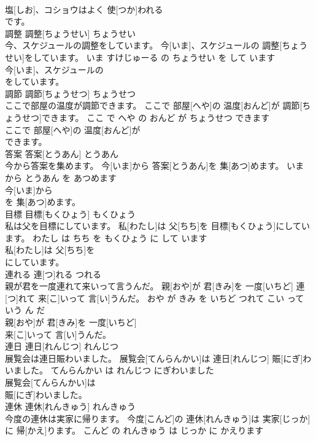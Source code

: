 \documentclass[8pt]{extreport}
\begin{document}
\begin{CJK}{UTF8}{min}
\\	塩[しお]、コショウはよく 使[つか]われる
\\	です。			
\\	調整	調整[ちょうせい]	ちょうせい	
\\	今、スケジュールの調整をしています。	今[いま]、スケジュールの 調整[ちょうせい]をしています。	いま すけじゅーる の ちょうせい を して います	
\\	今[いま]、スケジュールの
\\	をしています。			
\\	調節	調節[ちょうせつ]	ちょうせつ	
\\	ここで部屋の温度が調節できます。	ここで 部屋[へや]の 温度[おんど]が 調節[ちょうせつ]できます。	ここ で へや の おんど が ちょうせつ できます	
\\	ここで 部屋[へや]の 温度[おんど]が
\\	できます。			
\\	答案	答案[とうあん]	とうあん	
\\	今から答案を集めます。	今[いま]から 答案[とうあん]を 集[あつ]めます。	いま から とうあん を あつめます	
\\	今[いま]から
\\	を 集[あつ]めます。			
\\	目標	目標[もくひょう]	もくひょう	
\\	私は父を目標にしています。	私[わたし]は 父[ちち]を 目標[もくひょう]にしています。	わたし は ちち を もくひょう に して います	
\\	私[わたし]は 父[ちち]を
\\	にしています。			
\\	連れる	連[つ]れる	つれる	
\\	親が君を一度連れて来いって言うんだ。	親[おや]が 君[きみ]を 一度[いちど] 連[つ]れて 来[こ]いって 言[い]うんだ。	おや が きみ を いちど つれて こい って いう ん だ	
\\	親[おや]が 君[きみ]を 一度[いちど]
\\	来[こ]いって 言[い]うんだ。			
\\	連日	連日[れんじつ]	れんじつ	
\\	展覧会は連日賑わいました。	展覧会[てんらんかい]は 連日[れんじつ] 賑[にぎ]わいました。	てんらんかい は れんじつ にぎわいました	
\\	展覧会[てんらんかい]は
\\	賑[にぎ]わいました。			
\\	連休	連休[れんきゅう]	れんきゅう	
\\	今度の連休は実家に帰ります。	今度[こんど]の 連休[れんきゅう]は 実家[じっか]に 帰[かえ]ります。	こんど の れんきゅう は じっか に かえります	

\end{CJK}
\end{document}
